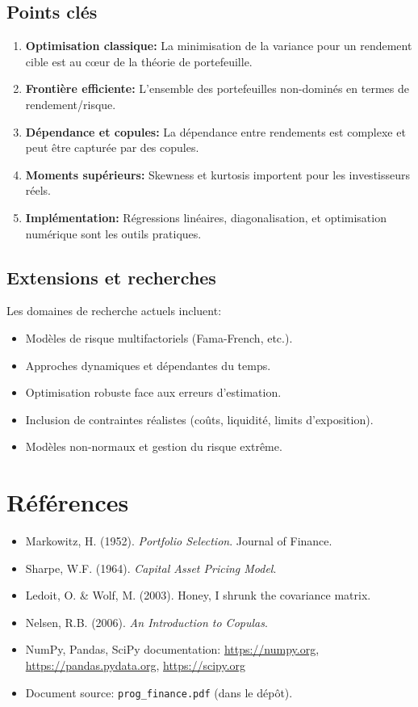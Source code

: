 \documentclass[11pt,a4paper]{article}
\begin{document}
\subsection{Points clés}

\begin{enumerate}
\item \textbf{Optimisation classique:} La minimisation de la variance pour un rendement cible est au cœur de la théorie de portefeuille.
\item \textbf{Frontière efficiente:} L'ensemble des portefeuilles non-dominés en termes de rendement/risque.
\item \textbf{Dépendance et copules:} La dépendance entre rendements est complexe et peut être capturée par des copules.
\item \textbf{Moments supérieurs:} Skewness et kurtosis importent pour les investisseurs réels.
\item \textbf{Implémentation:} Régressions linéaires, diagonalisation, et optimisation numérique sont les outils pratiques.
\end{enumerate}

\subsection{Extensions et recherches}

Les domaines de recherche actuels incluent:
\begin{itemize}
\item Modèles de risque multifactoriels (Fama-French, etc.).
\item Approches dynamiques et dépendantes du temps.
\item Optimisation robuste face aux erreurs d'estimation.
\item Inclusion de contraintes réalistes (coûts, liquidité, limits d'exposition).
\item Modèles non-normaux et gestion du risque extrême.
\end{itemize}

\section{Références}

\begin{itemize}
\item Markowitz, H. (1952). \emph{Portfolio Selection}. Journal of Finance.
\item Sharpe, W.F. (1964). \emph{Capital Asset Pricing Model}.
\item Ledoit, O. \& Wolf, M. (2003). Honey, I shrunk the covariance matrix.
\item Nelsen, R.B. (2006). \emph{An Introduction to Copulas}.
\item NumPy, Pandas, SciPy documentation: \url{https://numpy.org}, \url{https://pandas.pydata.org}, \url{https://scipy.org}
\item Document source: \texttt{prog\_finance.pdf} (dans le dépôt).
\end{itemize}
\end{document}
